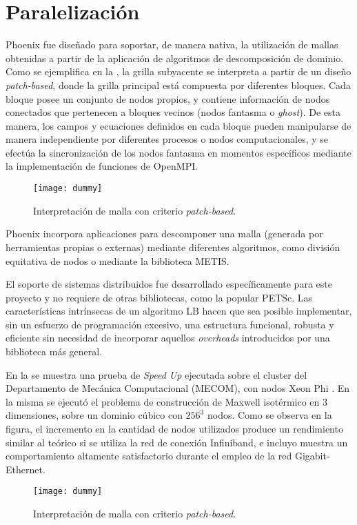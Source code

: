 \section{Paralelizaci\'on}

Phoenix fue dise\~nado para soportar, de manera nativa, la utilizaci\'on de mallas obtenidas a partir de la aplicaci\'on de algoritmos de descomposici\'on de dominio. Como se ejemplifica en la , la grilla subyacente se interpreta a partir de un dise\~no \emph{patch-based}, donde la grilla principal est\'a compuesta por diferentes bloques. Cada bloque posee un conjunto de nodos propios, y contiene informaci\'on de nodos conectados que pertenecen a bloques vecinos (nodos fantasma o \emph{ghost}). De esta manera, los campos y ecuaciones definidos en cada bloque pueden manipularse de manera independiente por diferentes procesos o nodos computacionales, y se efect\'ua la sincronizaci\'on de los nodos fantasma en momentos espec\'ificos mediante la implementaci\'on de funciones de OpenMPI. 

\begin{figure}[ht]
	\centering
	\texttt{[image: dummy]}
	\caption{Interpretaci\'on de malla con criterio \emph{patch-based}.}
	\label{fig:patch_based}
\end{figure}

Phoenix incorpora aplicaciones para descomponer una malla (generada por herramientas propias o externas) mediante diferentes algoritmos, como divisi\'on equitativa de nodos o mediante la biblioteca METIS.

El soporte de sistemas distribuidos fue desarrollado espec\'ificamente para este proyecto y no requiere de otras bibliotecas, como la popular PETSc. Las caracter\'isticas intr\'insecas de un algoritmo LB hacen que sea posible implementar, sin un esfuerzo de programaci\'on excesivo, una estructura funcional, robusta y eficiente sin necesidad de incorporar aquellos \emph{overheads} introducidos por una biblioteca m\'as general. 

En la  se muestra una prueba de \emph{Speed Up} ejecutada sobre el cluster del Departamento de Mec\'anica Computacional (MECOM), con nodos Xeon Phi . En la misma se ejecut\'o el problema de construcci\'on de Maxwell isot\'ermico en 3 dimensiones, sobre un dominio c\'ubico con $256^3$ nodos. Como se observa en la figura, el incremento en la cantidad de nodos utilizados produce un rendimiento similar al te\'orico si se utiliza la red de conexi\'on Infiniband, e incluyo muestra un comportamiento altamente satisfactorio durante el empleo de la red Gigabit-Ethernet.

\begin{figure}[ht]
	\centering
	\texttt{[image: dummy]}
	\caption{Interpretaci\'on de malla con criterio \emph{patch-based}.}
	\label{fig:speedup_cpu}
\end{figure}